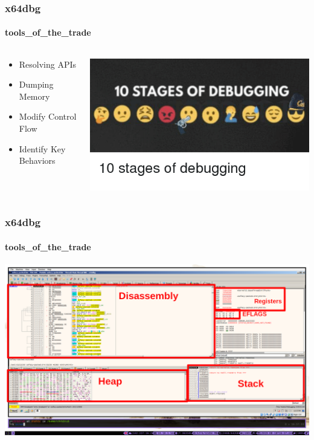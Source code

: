 \documentclass[aspectratio=169]{beamer}
\begin{document}
\begin{frame}
  \frametitle{x64dbg}
  \framesubtitle{tools\_of\_the\_trade}
  \begin{columns}
    \begin{column}{.3\textwidth}
      \begin{itemize}
      \item{Resolving APIs}
      \item{Dumping Memory}
      \item{Modify Control Flow}
      \item{Identify Key Behaviors}
      \end{itemize}
    \end{column}
    \hfill
    \begin{column}{.7\textwidth}
      \begin{center}
        \includegraphics[scale=0.5]{stages-of-debugging-meme}
      \end{center}
    \end{column}
  \end{columns}
\end{frame}

\begin{frame}
  \frametitle{x64dbg}
  \framesubtitle{tools\_of\_the\_trade}
  \begin{center}
    \includegraphics[scale=0.75]{x64dbg-overview}
  \end{center}
\end{frame}
\end{document}
